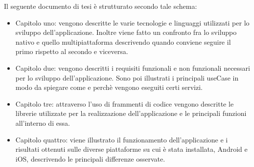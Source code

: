 Il seguente documento di tesi \`e strutturato secondo tale schema:
\begin{itemize}
    \item Capitolo uno: vengono descritte le varie tecnologie e linguaggi utilizzati per lo sviluppo dell'applicazione. Inoltre viene fatto un confronto fra lo sviluppo nativo e quello multipiattaforma descrivendo quando conviene seguire il primo rispetto al secondo e viceversa.
    \item Capitolo due: vengono descritti i requisiti funzionali e non funzionali necessari per lo sviluppo dell'applicazione. Sono poi illustrati i principali useCase in modo da spiegare come e perch\`e vengono eseguiti certi servizi.
    \item Capitolo tre: attraverso l'uso di frammenti di codice vengono descritte le librerie utilizzate per la realizzazione dell'applicazione e le principali funzioni all'interno di essa.   
    \item Capitolo quattro: viene illustrato il funzionamento dell'applicazione e i risultati ottenuti sulle diverse piattaforme su cui \`e stata installata, Android e iOS, descrivendo le principali differenze osservate.
\end{itemize}

